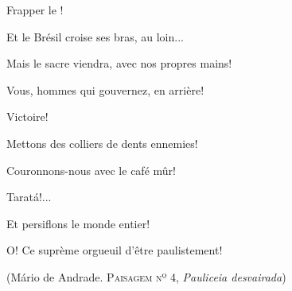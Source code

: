 Frapper le !

Et le Brésil croise ses bras, au loin...

Mais le sacre viendra, avec nos propres mains!

Vous, hommes qui gouvernez, en arrière!

Victoire!

Mettons des colliers de dents ennemies!

Couronnons-nous avec le café mûr!

Taratá!...

Et persiflons le monde entier!

O! Ce suprème orgueuil d'être paulistement!

(Mário de Andrade\textsc{. Paisagem nº 4,} \emph{Pauliceia
desvairada}\textsc{)}
